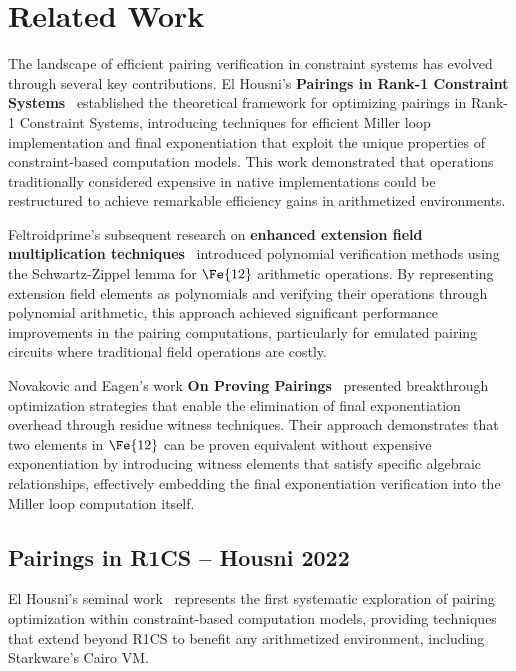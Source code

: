 \section{Related Work}

The landscape of efficient pairing verification in constraint systems has evolved through several key contributions. El Housni's \textbf{Pairings in Rank-1 Constraint Systems}~\cite{ACNS:ElHousni23} established the theoretical framework for optimizing pairings in Rank-1 Constraint Systems, introducing techniques for efficient Miller loop implementation and final exponentiation that exploit the unique properties of constraint-based computation models. This work demonstrated that operations traditionally considered expensive in native implementations could be restructured to achieve remarkable efficiency gains in arithmetized environments.

Feltroidprime's subsequent research on \textbf{enhanced extension field multiplication techniques}~\cite{FXFM23} introduced polynomial verification methods using the Schwartz-Zippel lemma for $\Fe{12}$ arithmetic operations. By representing extension field elements as polynomials and verifying their operations through polynomial arithmetic, this approach achieved significant performance improvements in the pairing computations, particularly for emulated pairing circuits where traditional field operations are costly.

Novakovic and Eagen's work \textbf{On Proving Pairings}~\cite{EPRINT:NovEag24} presented breakthrough optimization strategies that enable the elimination of final exponentiation overhead through residue witness techniques. Their approach demonstrates that two elements in $\Fe{12}$ can be proven equivalent without expensive exponentiation by introducing witness elements that satisfy specific algebraic relationships, effectively embedding the final exponentiation verification into the Miller loop computation itself.

\subsection{Pairings in R1CS -- Housni 2022}

El Housni's seminal work~\cite{ACNS:ElHousni23} represents the first systematic exploration of pairing optimization within constraint-based computation models, providing techniques that extend beyond R1CS to benefit any arithmetized environment, including Starkware's Cairo VM\cite{cairo}.

